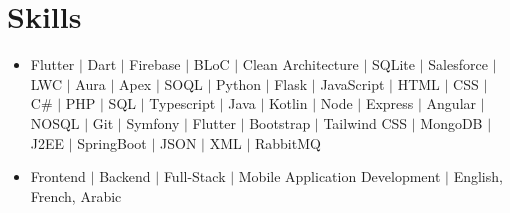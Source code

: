 \documentclass[a4paper,12pt]{article}
\begin{document}
\section{Skills}
\begin{itemize}
\item \normalsize{Flutter $\vert$ Dart $\vert$ Firebase $\vert$ BLoC $\vert$ Clean Architecture $\vert$ SQLite $\vert$ Salesforce $\vert$ LWC $\vert$ Aura $\vert$ Apex $\vert$ SOQL $\vert$ Python $\vert$ Flask $\vert$ JavaScript $\vert$ HTML $\vert$ CSS $\vert$ C\# $\vert$ PHP $\vert$ SQL  $\vert$ Typescript $\vert$ Java $\vert$ Kotlin $\vert$ Node $\vert$ Express $\vert$ Angular $\vert$ NOSQL $\vert$ Git $\vert$ Symfony $\vert$ Flutter $\vert$ Bootstrap $\vert$ Tailwind CSS $\vert$ MongoDB $\vert$ J2EE $\vert$ SpringBoot $\vert$ JSON $\vert$ XML $\vert$ RabbitMQ}\\
\item \normalsize{Frontend $\vert$ Backend $\vert$ Full-Stack $\vert$ Mobile Application Development $\vert$ English, French, Arabic}\\
\end{itemize}



\vfill
{}
\end{document}
